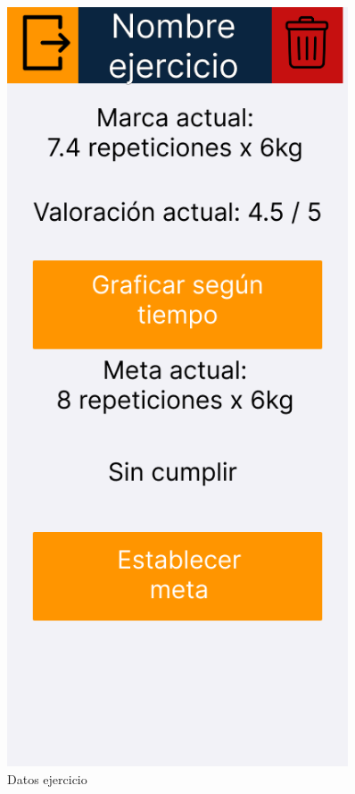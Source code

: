 \begin{figure}[H]
   \centering
   \begin{minipage}{0.45\textwidth}
      \centering
      \includegraphics[width=0.9\textwidth]{fotos/Frame 42.png}
      \caption{Datos ejercicio}

\end{minipage}
\end{figure}
